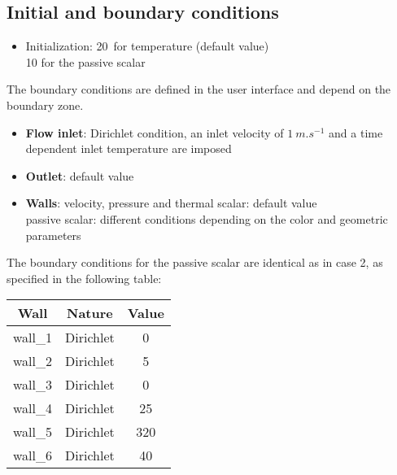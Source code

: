         \subsection{Initial and boundary conditions}

\begin{itemize}
\renewcommand{\labelitemi}{$\rightarrow$}
        \item Initialization: 20\degresC\ for temperature (default value) \\
        \hspace*{2.1cm}        10 for the passive scalar
\end{itemize}

The boundary conditions are defined in the user interface and depend on the
boundary zone.

\begin{itemize}
        \item {\bfseries Flow inlet}: Dirichlet condition, an inlet velocity of
$1\ m.s^{-1}$ and a time dependent inlet temperature are imposed
        \item {\bfseries Outlet}: default value
        \item {\bfseries Walls}: velocity, pressure and thermal scalar: default value \\
                    \hspace*{1.25cm} passive scalar: different conditions
depending on the color and geometric parameters
\end{itemize}

The boundary conditions for the passive scalar are identical as in case 2,
as specified in the following table:

\begin{center}
\begin{tabular}{|c|c|c|}
\hline
Wall & Nature & Value \\
\hline
wall\_1 & Dirichlet  & 0 \\
\hline
wall\_2 & Dirichlet  & 5 \\
\hline
wall\_3 & Dirichlet  & 0 \\
\hline
wall\_4 & Dirichlet  & 25 \\
\hline
wall\_5 & Dirichlet  & 320 \\
\hline
wall\_6 & Dirichlet  & 40 \\
\hline
\end{tabular}
\end{center}

